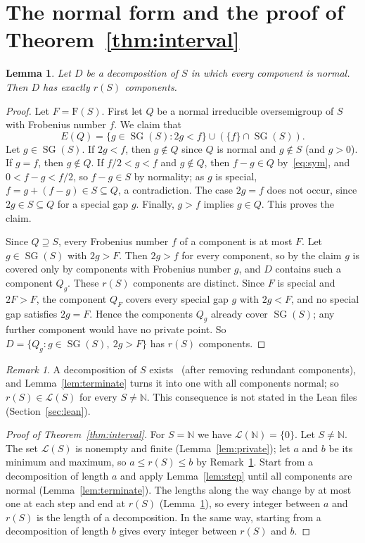\documentclass[11pt]{article}
\newtheorem{lemma}{Lemma}
\theoremstyle{definition}
\theoremstyle{remark}
\newtheorem{remark}{Remark}
\newcommand{\N}{\mathbb N}
\DeclareMathOperator{\SG}{SG}
\newcommand{\F}{\mathrm F}
\begin{document}
\section{The normal form and the proof of Theorem~\ref{thm:interval}}\label{sec:normal}

\begin{lemma}\label{lem:normal}
Let $D$ be a decomposition of $S$ in which every component is normal. Then
$D$ has exactly $r(S)$ components.
\end{lemma}

\begin{proof}
Let $F=\F(S)$. First let $Q$ be a normal irreducible oversemigroup of $S$ with
Frobenius number $f$. We claim that
\[
E(Q)=\{g\in\SG(S):2g<f\}\cup(\{f\}\cap\SG(S)).
\]
Let $g\in\SG(S)$. If $2g<f$, then $g\notin Q$ since $Q$ is normal and
$g\notin S$ (and $g>0$). If $g=f$, then $g\notin Q$. If $f/2<g<f$ and
$g\notin Q$, then $f-g\in Q$ by~\eqref{eq:sym}, and $0<f-g<f/2$, so $f-g\in S$
by normality; as $g$ is special, $f=g+(f-g)\in S\subseteq Q$, a
contradiction. The case $2g=f$ does not occur, since $2g\in S\subseteq Q$ for
a special gap $g$. Finally, $g>f$ implies $g\in Q$. This proves the claim.

Since $Q\supseteq S$, every Frobenius number $f$ of a component is at most
$F$. Let $g\in\SG(S)$ with $2g>F$. Then $2g>f$ for every component, so by the
claim $g$ is covered only by components with Frobenius number $g$, and $D$
contains such a component $Q_g$. These $r(S)$ components are distinct. Since
$F$ is special and $2F>F$, the component $Q_F$ covers every special gap $g$
with $2g<F$, and no special gap satisfies $2g=F$. Hence the components $Q_g$
already cover $\SG(S)$; any further component would have no private point. So
$D=\{Q_g: g\in\SG(S),\ 2g>F\}$ has $r(S)$ components.
\end{proof}

\begin{remark}\label{rem:r}
A decomposition of $S$ exists~\cite[Chapter~3, Proposition~4.44]{rg} (after
removing redundant components), and Lemma~\ref{lem:terminate} turns it into one
with all components normal; so $r(S)\in\mathcal L(S)$ for every $S\ne\N$. This
consequence is not stated in the Lean files (Section~\ref{sec:lean}).
\end{remark}

\begin{proof}[Proof of Theorem~\ref{thm:interval}]
For $S=\N$ we have $\mathcal L(\N)=\{0\}$. Let $S\ne\N$. The set
$\mathcal L(S)$ is nonempty and finite (Lemma~\ref{lem:private}); let
$a$ and $b$ be its minimum and maximum, so $a\le r(S)\le b$ by
Remark~\ref{rem:r}. Start from a decomposition of length $a$ and apply
Lemma~\ref{lem:step} until all components are normal
(Lemma~\ref{lem:terminate}). The lengths along the way change by at most one at
each step and end at $r(S)$ (Lemma~\ref{lem:normal}), so every integer between
$a$ and $r(S)$ is the length of a decomposition. In the same way, starting from
a decomposition of length $b$ gives every integer between $r(S)$ and $b$.
\end{proof}
\end{document}
